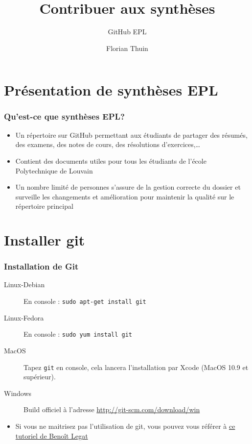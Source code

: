 \documentclass{beamer}
\title{Contribuer aux synthèses}
\subtitle{GitHub EPL}
\author{Florian Thuin}
\institute{Ecole Polytechnique de Louvain}
\begin{document}
\begin{frame}[plain]
	\titlepage
\end{frame}



\section{Présentation de synthèses EPL}

\begin{frame}
	\frametitle{Qu'est-ce que synthèses EPL?}
		\begin{itemize}
 			\item Un répertoire sur GitHub permettant aux étudiants de
 			    partager des résumés, des examens, des notes de cours,
 			    des résolutions d'exercices,\ldots
 			\item Contient des documents utiles pour tous les étudiants
 			    de l'école Polytechnique de Louvain
 			\item Un nombre limité de personnes s'assure de la gestion
 			    correcte du dossier et surveille les changements et
 			    amélioration pour maintenir la qualité sur le répertoire
 			    principal
 		\end{itemize}
\end{frame}

\section{Installer git}

\begin{frame}[fragile]
    \frametitle{Installation de Git}
    \begin{description}
        \item[Linux-Debian] En console : \verb#sudo apt-get install git#
        \item[Linux-Fedora] En console : \verb#sudo yum install git#
        \item[MacOS] Tapez \verb#git# en console, cela lancera
            l'installation par Xcode (MacOS 10.9 et supérieur).
        \item[Windows] Build officiel à l'adresse
            \url{http://git-scm.com/download/win}
    \end{description}
    \begin{itemize}
        \item Si vous ne maitrisez pas l'utilisation de git, vous pouvez
            vous référer à
            \href{http://sites.uclouvain.be/SystInfo/notes/Outils/html/git.html}{ce
            tutoriel de Benoît Legat}
    \end{itemize}
\end{frame}
\end{document}
